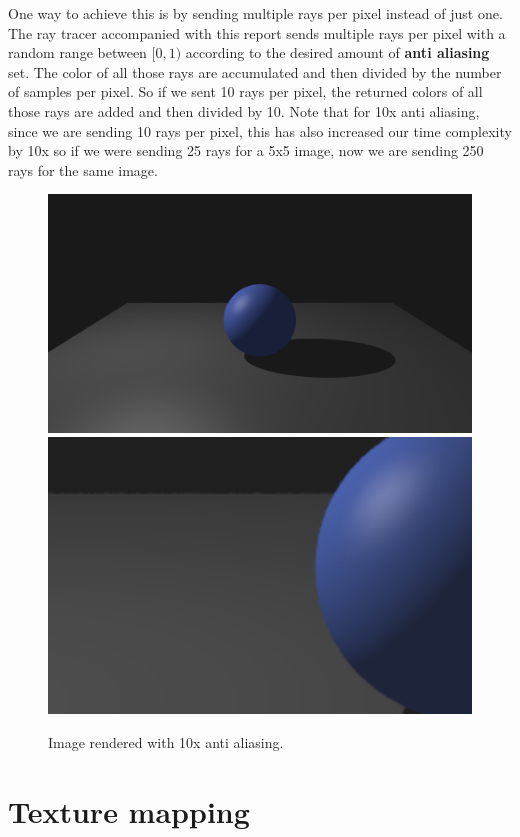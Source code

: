 \documentclass[11pt,a4paper]{article}
\begin{document}
	\noindent
	One way to achieve this is by sending multiple rays per pixel instead of just one. The ray tracer accompanied with this report sends multiple rays per pixel with a random range between $[0, 1)$ according to the desired amount of \textbf{anti aliasing} set. The color of all those rays are accumulated and then divided by the number of samples per pixel. So if we sent 10 rays per pixel, the returned colors of all those rays are added and then divided by 10. Note that for 10x anti aliasing, since we are sending 10 rays per pixel, this has also increased our time complexity by 10x so if we were sending 25 rays for a 5x5 image, now we are sending 250 rays for the same image.
	
	\begin{figure}[H]
		\centering
		\captionsetup{justification=centering}
		\includegraphics[width=.45\textwidth]{antialiased_pointlight.png}\quad
		\includegraphics[width=.39\textwidth]{10x_antialiasing.png}\quad
		\caption{Image rendered with 10x anti aliasing.}
	\end{figure}

	\section{Texture mapping}
	
\end{document}
